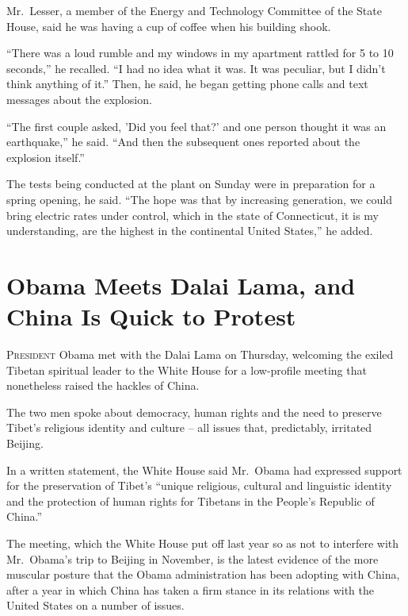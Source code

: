 ﻿\documentclass[12pt]{article}
\begin{document}
Mr.~Lesser, a member of the Energy and Technology Committee of the State House, said he was having a
cup of coffee when his building shook.

``There was a loud rumble and my windows in my apartment rattled for 5 to 10 seconds,'' he recalled.
``I had no idea what it was. It was peculiar, but I didn't think anything of it.'' Then, he said, he
began getting phone calls and text messages about the explosion.

``The first couple asked, 'Did you feel that?' and one person thought it was an earthquake,'' he
said. ``And then the subsequent ones reported about the explosion itself.''

The tests being conducted at the plant on Sunday were in preparation for a spring opening, he said.
``The hope was that by increasing generation, we could bring electric rates under control, which in
the state of Connecticut, it is my understanding, are the highest in the continental United
States,'' he added.

\section{Obama Meets Dalai Lama, and China Is Quick to Protest}

\lettrine{P}{resident} Obama met with the Dalai Lama on Thursday, welcoming
the exiled Tibetan spiritual leader to the White House for a low-profile meeting that nonetheless
raised the hackles of China.


The two men spoke about democracy, human rights and the need to preserve Tibet's religious identity
and culture -- all issues that, predictably, irritated Beijing.

In a written statement, the White House said Mr.~Obama had expressed support for the preservation of
Tibet's ``unique religious, cultural and linguistic identity and the protection of human rights for
Tibetans in the People's Republic of China.''

The meeting, which the White House put off last year so as not to interfere with Mr.~Obama's trip to
Beijing in November, is the latest evidence of the more muscular posture that the Obama
administration has been adopting with China, after a year in which China has taken a firm stance in
its relations with the United States on a number of issues.
\end{document}
